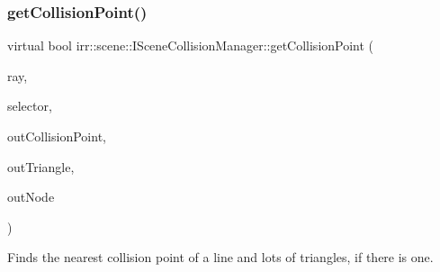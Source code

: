 \subsubsection{\texorpdfstring{get\+Collision\+Point()}{getCollisionPoint()}\hspace{0.1cm}{\footnotesize\ttfamily [2/2]}}
{\footnotesize\ttfamily virtual bool irr\+::scene\+::\+I\+Scene\+Collision\+Manager\+::get\+Collision\+Point (\begin{DoxyParamCaption}\item[{const \hyperlink{classirr_1_1core_1_1line3d}{core\+::line3d}$<$ \hyperlink{namespaceirr_a0277be98d67dc26ff93b1a6a1d086b07}{f32} $>$ \&}]{ray,  }\item[{\hyperlink{classirr_1_1scene_1_1ITriangleSelector}{I\+Triangle\+Selector} $\ast$}]{selector,  }\item[{\hyperlink{namespaceirr_1_1core_ae6e2b2a6c552833ebbd5b7463d03586b}{core\+::vector3df} \&}]{out\+Collision\+Point,  }\item[{\hyperlink{namespaceirr_1_1core_a8983bda2678a7a67d97bf3c7be6c31c7}{core\+::triangle3df} \&}]{out\+Triangle,  }\item[{\hyperlink{classirr_1_1scene_1_1ISceneNode}{I\+Scene\+Node} $\ast$\&}]{out\+Node }\end{DoxyParamCaption})\hspace{0.3cm}{\ttfamily [pure virtual]}}



Finds the nearest collision point of a line and lots of triangles, if there is one. 


